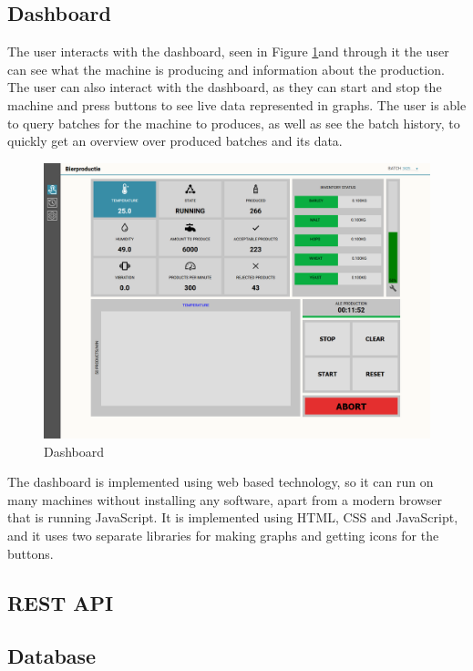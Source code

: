 \subsection{Dashboard}
The user interacts with the dashboard, seen in Figure \ref{figure:dashboard}and
through it the user can see what the machine is producing and information about
the production. The user can also interact with the dashboard, as they can start
and stop the machine and press buttons to see live data represented in graphs.
The user is able to query batches for the machine to produces, as well as see
the batch history, to quickly get an overview over produced batches and its data.\\

\begin{figure}[ht]
	\centering
	\includegraphics[width=1\linewidth]{images/dashboard.png}
	\caption{Dashboard}
	\label{figure:dashboard}
\end{figure}

The dashboard is implemented using web based technology, so it can run on many
machines without installing any software, apart from a modern browser that is
running JavaScript. It is implemented using HTML, CSS and JavaScript, and it
uses two separate libraries for making graphs and getting icons for the buttons.

\subsection{REST API}

\subsection{Database}


